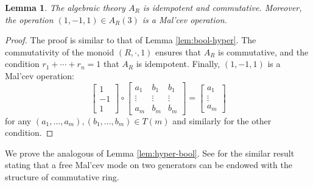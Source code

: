 \documentclass{amsart}
\numberwithin{equation}{section}
\theoremstyle{plain}
\newtheorem{lemma}[theorem]{Lemma}
\theoremstyle{definition}
\begin{document}
\begin{lemma}
  The algebraic theory $A_R$ is idempotent and commutative. 
  Moreover, the operation $(1,-1,1) \in A_R(3)$ is a Mal'cev operation. 
\end{lemma}
 \begin{proof}
    The proof is similar to that of Lemma \ref{lem:bool-hyper}. 
    The commutativity of the monoid $(R, \cdot, 1)$ ensures that $A_R$ is commutative, and the condition $r_1 + \cdots + r_n =1$ that $A_R$ is idempotent.
    Finally, $(1,-1,1)$ is a Mal'cev operation: 
    \begin{equation*} 
    \begin{bmatrix}
      1 \\
      -1\\
      1 
      \end{bmatrix} \circ  
      \begin{bmatrix}
      a_1 & b_1 & b_1 \\
      \vdots & \vdots & \vdots \\
      a_m & b_m & b_m
      \end{bmatrix} =
      \begin{bmatrix}
      a_1\\
      \vdots \\
      a_m 
      \end{bmatrix}
\end{equation*} 
for any $(a_1, \ldots, a_m), (b_1, \ldots, b_m) \in T(m)$ and similarly for the other condition. 
\end{proof}

We prove the analogous of Lemma \ref{lem:hyper-bool}. 
See \cite[Theorem 6.3.3]{RS02} for the similar result stating that a free Mal'cev mode on two generators can be endowed with the structure of commutative ring. 
\end{document}
